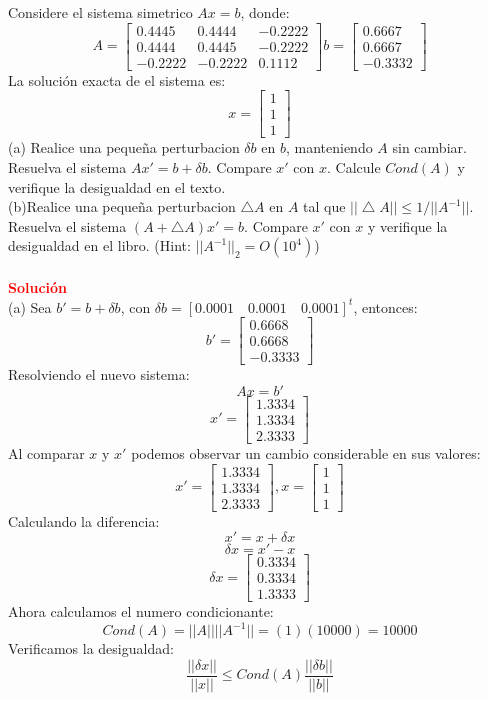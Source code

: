 Considere el sistema simetrico $Ax=b$, donde:
$$A=\begin{bmatrix}
    0.4445&0.4444&-0.2222\\
    0.4444&0.4445&-0.2222\\
    -0.2222&-0.2222&0.1112
\end{bmatrix}
b=\begin{bmatrix}
    0.6667\\
    0.6667\\
    -0.3332
\end{bmatrix}
$$
La solución exacta de el sistema es:
$$x=\begin{bmatrix}
    1\\
    1\\
    1
\end{bmatrix}
$$
(a) Realice una pequeña perturbacion $\delta b$ en $b$, manteniendo $A$ sin cambiar. Resuelva el sistema $Ax'=b+\delta b$. Compare $x'$ con $x$. Calcule $Cond(A)$ y verifique la desigualdad en el texto.\\
(b)Realice una pequeña perturbacion $\bigtriangleup A$ en $A$ tal que $||\bigtriangleup A||\leq 1/||A^{-1}||$. Resuelva el sistema  $(A+\bigtriangleup A)x'=b$. Compare $x'$ con $x$ y verifique la desigualdad en el libro. (Hint: $||A^{-1}||_2=O(10^4)$)
\\\\
\noindent \textcolor{red}{\bf Soluci\'on}\\
(a) Sea $b'=b+\delta b$, con $\delta b=[0.0001 \quad 0.0001 \quad 0.0001]^t$, entonces:
$$b'=\begin{bmatrix}
    0.6668\\
    0.6668\\
    -0.3333
\end{bmatrix}
$$
Resolviendo el nuevo sistema:
$$Ax=b'$$
$$x'=\begin{bmatrix}
    1.3334\\
    1.3334\\
    2.3333
\end{bmatrix}
$$
Al comparar $x$ y $x'$ podemos observar un cambio considerable en sus valores:
$$x'=\begin{bmatrix}
    1.3334\\
    1.3334\\
    2.3333
\end{bmatrix}
, x=\begin{bmatrix}
    1\\
    1\\
    1
\end{bmatrix}
$$
Calculando la diferencia:
$$x'=  x+\delta x $$
$$\delta x = x'-x$$
$$\delta x=\begin{bmatrix}
    0.3334\\
   0.3334\\
   1.3333
\end{bmatrix}$$
Ahora calculamos el numero condicionante:
$$Cond(A)=||A||||A^{-1}||= (1)(10000)=10000$$
Verificamos la desigualdad:
$$\frac{||\delta x||}{||x||} \leq Cond(A)\frac{||\delta b||}{||b||}$$

